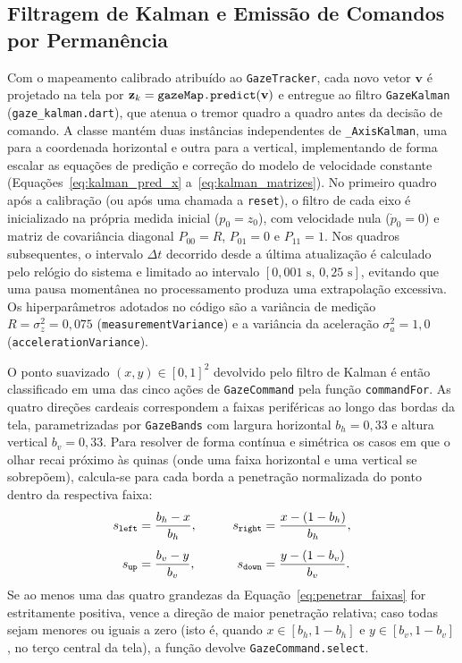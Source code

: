 \subsection{Filtragem de Kalman e Emissão de Comandos por Permanência} \label{sec:met_kalman_dwell}

Com o mapeamento calibrado atribuído ao \texttt{GazeTracker}, cada novo vetor $\mathbf{v}$ é projetado na tela por $\mathbf{z}_k = \text{\texttt{gazeMap.predict}}(\mathbf{v})$ e entregue ao filtro \texttt{GazeKalman} (\texttt{gaze\_kalman.dart}), que atenua o tremor quadro a quadro antes da decisão de comando. A classe mantém duas instâncias independentes de \texttt{\_AxisKalman}, uma para a coordenada horizontal e outra para a vertical, implementando de forma escalar as equações de predição e correção do modelo de velocidade constante (Equações~\ref{eq:kalman_pred_x} a~\ref{eq:kalman_matrizes}). No primeiro quadro após a calibração (ou após uma chamada a \texttt{reset}), o filtro de cada eixo é inicializado na própria medida inicial ($p_0 = z_0$), com velocidade nula ($\dot{p}_0 = 0$) e matriz de covariância diagonal $P_{00} = R$, $P_{01} = 0$ e $P_{11} = 1$. Nos quadros subsequentes, o intervalo $\Delta t$ decorrido desde a última atualização é calculado pelo relógio do sistema e limitado ao intervalo $[0{,}001\text{~s},\, 0{,}25\text{~s}]$, evitando que uma pausa momentânea no processamento produza uma extrapolação excessiva. Os hiperparâmetros adotados no código são a variância de medição $R = \sigma_z^2 = 0{,}075$ (\texttt{measurementVariance}) e a variância da aceleração $\sigma_a^2 = 1{,}0$ (\texttt{accelerationVariance}).

O ponto suavizado $(x, y) \in [0, 1]^2$ devolvido pelo filtro de Kalman é então classificado em uma das cinco ações de \texttt{GazeCommand} pela função \texttt{commandFor}. As quatro direções cardeais correspondem a faixas periféricas ao longo das bordas da tela, parametrizadas por \texttt{GazeBands} com largura horizontal $b_h = 0{,}33$ e altura vertical $b_v = 0{,}33$. Para resolver de forma contínua e simétrica os casos em que o olhar recai próximo às quinas (onde uma faixa horizontal e uma vertical se sobrepõem), calcula-se para cada borda a penetração normalizada do ponto dentro da respectiva faixa:
\begin{equation}
    \begin{aligned}
        s_{\text{\texttt{left}}} &= \frac{b_h - x}{b_h}, &\qquad
        s_{\text{\texttt{right}}} &= \frac{x - (1 - b_h)}{b_h}, \\[1ex]
        s_{\text{\texttt{up}}} &= \frac{b_v - y}{b_v}, &\qquad
        s_{\text{\texttt{down}}} &= \frac{y - (1 - b_v)}{b_v}.
    \end{aligned}
    \label{eq:penetrar_faixas}
\end{equation}
Se ao menos uma das quatro grandezas da Equação~\ref{eq:penetrar_faixas} for estritamente positiva, vence a direção de maior penetração relativa; caso todas sejam menores ou iguais a zero (isto é, quando $x \in [b_h, 1 - b_h]$ e $y \in [b_v, 1 - b_v]$, no terço central da tela), a função devolve \texttt{GazeCommand.select}.

